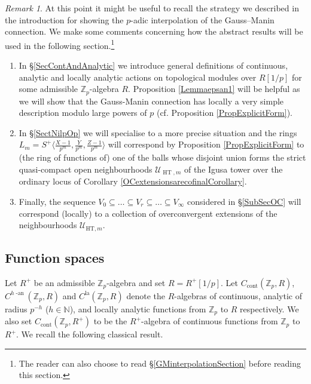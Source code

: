 \documentclass[10pt, oneside]{amsart}
\numberwithin{equation}{subsection}
\theoremstyle{definition}
\theoremstyle{remark}
\newtheorem{remark}[equation]{Remark}
\newcommand{\mbb}[1]{\mathbb{#1}}
\newcommand{\opn}[1]{\operatorname{#1}}
\def\Z{{\mathbb{Z}}}
\def\N{{\mathbb{N}}}
\def\zp{{\Z_p}}
\begin{document}
\begin{remark}
At this point it might be useful to recall the strategy we described in the introduction for showing the $p$-adic interpolation of the Gauss--Manin connection. We make some comments concerning how the abstract results will be used in the following section.\footnote{The reader can also choose to read \S \ref{GMinterpolationSection} before reading this section.}
\begin{enumerate}
    \item In \S \ref{SecContAndAnalytic} we introduce general definitions of continuous, analytic and locally analytic actions on topological modules over $R[1/p]$ for some admissible $\zp$-algebra $R$. Proposition \ref{Lemmaepsan1} will be helpful as we will show that the Gauss-Manin connection has locally a very simple description modulo large powers of $p$ (cf. Proposition \ref{PropExplicitForm}).
    \item In \S \ref{SectNilpOp} we will specialise to a more precise situation and the rings $L_m = S^+ \langle \frac{X - 1}{p^m}, \frac{Y}{p^m}, \frac{Z -1}{p^m} \rangle$ will correspond by Proposition \ref{PropExplicitForm} to (the ring of functions of) one of the balls whose disjoint union forms the strict quasi-compact open neighbourhoods $\mathcal{U}_{\opn{HT}, m}$ of the Igusa tower over the ordinary locus of Corollary \ref{OCextensionsarecofinalCorollary}.
    \item Finally, the sequence $V_0 \subseteq \ldots \subseteq V_r \subseteq \ldots \subseteq V_\infty$ considered in \S \ref{SubSecOC} will correspond (locally) to a collection of overconvergent extensions of the neighbourhoods $\mathcal{U}_{\mathrm{HT}, m}$.
\end{enumerate}
\end{remark}

\subsection{Function spaces}

Let $R^+$ be an admissible $\zp$-algebra and set $R = R^+[1/p]$. Let $C_{\opn{cont}}(\zp, R)$, $C^{h\opn{-an}}(\zp, R)$ and $C^{\opn{la}}(\zp, R)$ denote the $R$-algebras of continuous, analytic of radius $p^{-h}$ ($h \in \N$), and locally analytic functions from $\zp$ to $R$ respectively. We also set $C_{\opn{cont}}(\zp, R^+)$ to be the $R^+$-algebra of continuous functions from $\mbb{Z}_p$ to $R^+$. We recall the following classical result.
\end{document}
